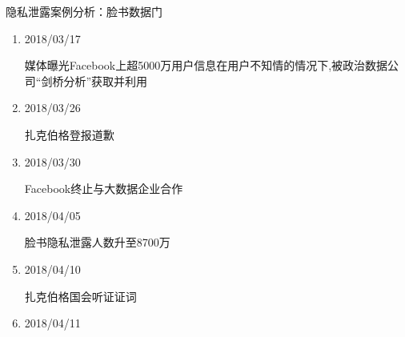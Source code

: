 \documentclass[11pt]{beamer}
\begin{document}
\begin{frame}{隐私泄露案例分析：脸书数据门}

	\begin{minipage}[t]{0.5\linewidth}
	\footnotesize
	\begin{enumerate}
		\item 2018/03/17 
		
		媒体曝光Facebook上超5000万用户信息在用户不知情的情况下,被政治数据公司“剑桥分析”获取并利用
		\item 2018/03/26 
		
		扎克伯格登报道歉
		\item 2018/03/30 
		
		Facebook终止与大数据企业合作
		\item 2018/04/05 
		
		脸书隐私泄露人数升至8700万
		\item 2018/04/10 
		
		扎克伯格国会听证证词
		\item 2018/04/11 
		

\end{enumerate}
\end{minipage}
\end{frame}
\end{document}
